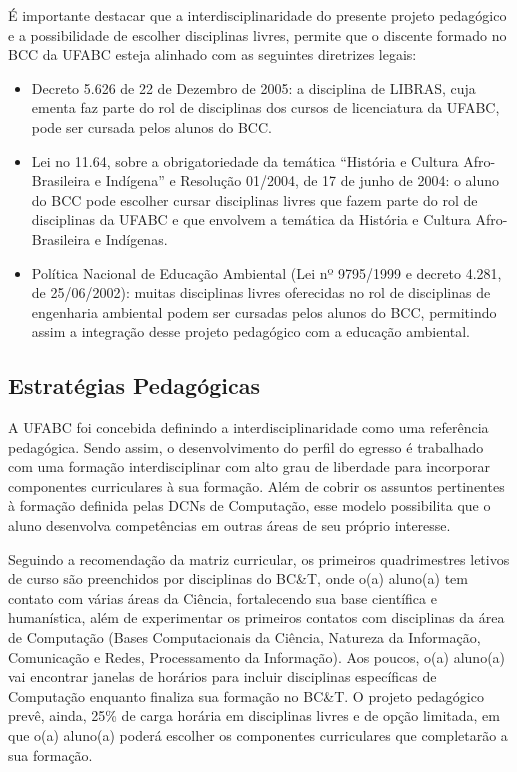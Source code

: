 É importante destacar que a interdisciplinaridade do presente projeto pedagógico e a possibilidade de escolher disciplinas livres, permite que o discente formado no BCC da UFABC esteja alinhado com as seguintes diretrizes legais:

\begin{itemize}
	
	\item Decreto 5.626 de 22 de Dezembro de 2005: a disciplina de LIBRAS, cuja
	ementa faz parte do rol de disciplinas dos cursos de licenciatura da UFABC, pode ser cursada pelos alunos do BCC.
	
	\item Lei no 11.64, sobre a obrigatoriedade da temática ``História e Cultura Afro-Brasileira e Indígena'' e Resolução 01/2004, de 17 de junho de 2004: o aluno do BCC pode escolher cursar disciplinas livres que fazem parte do rol de disciplinas da UFABC e que envolvem a temática da História e Cultura Afro-Brasileira e Indígenas.
	
	\item Política Nacional de Educação Ambiental (Lei nº 9795/1999 e decreto  4.281, de 25/06/2002): muitas disciplinas livres oferecidas no rol de disciplinas de engenharia ambiental podem ser cursadas pelos alunos do BCC, permitindo assim a integração desse projeto pedagógico com a educação ambiental.
\end{itemize}



\subsection{Estratégias Pedagógicas}

A UFABC foi concebida definindo a interdisciplinaridade como uma referência pedagógica. Sendo assim,  o desenvolvimento
do perfil do egresso é trabalhado com uma formação interdisciplinar com alto grau de liberdade para incorporar  
componentes curriculares à sua formação. Além de cobrir os assuntos pertinentes à formação definida pelas DCNs de Computação,
esse modelo possibilita que o aluno desenvolva competências em outras áreas de seu próprio interesse.

Seguindo a recomendação da matriz curricular, os primeiros quadrimestres letivos de curso são preenchidos por disciplinas do BC\&T, onde o(a) aluno(a) tem contato com várias áreas da Ciência, fortalecendo sua base científica e humanística, além de experimentar os primeiros contatos
com disciplinas da área de Computação (Bases Computacionais da Ciência, Natureza da Informação, Comunicação e Redes, Processamento da Informação). Aos poucos, o(a) aluno(a) vai encontrar janelas de horários para incluir disciplinas específicas de Computação enquanto finaliza sua formação no BC\&T. O projeto pedagógico prevê, ainda, 25\% de carga horária em disciplinas livres e de opção limitada, em que o(a) aluno(a) poderá escolher os componentes curriculares que completarão a sua formação.

